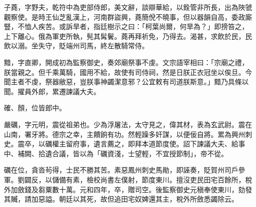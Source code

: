 \begin{pinyinscope}
 子蕘，字野夫，乾符中為吏部侍郎，美文辭，談辯華給，以銓管非所長，出為陜虢觀察使。是時王仙芝亂漢上，河南群盜興，蕘簡侻不曉事，但以器韻自高，委政廝豎，不恤人疾苦。或訴旱者，指廷樹示之曰：「柯葉尚爾，何旱為？」即搒笞之，上下離心。俄為軍吏所執，髡其髯鬢。蕘再拜祈免，乃得去。渴甚，求飲於民，民飲以溺。坐失守，貶端州司馬，終左散騎常侍。



 黯，字直卿，開成初為監察御史，奏郊廟祭事不虔。文宗語宰相曰：「宗廟之禮，朕當親之。但千乘萬騎，國用不給，故使有司侍祠，然是日朕正衣冠坐以俟旦。今聞主者不虔，祭器敝惡，豈朕事神蠲潔意邪？公宜敕有司道朕斯意。」黯乃具條以聞。擢員外郎，累遷諫議大夫。



 確、顏，位皆郎中。



 嚴礪，字元明，震從祖弟也。少為浮屠法，太守見之，偉其材，表為玄武尉。震在山南，署牙將。德宗之幸，主饋餉有功。然輕躁多奸謀，以便佞自將。累為興州刺史。震卒，以礪權主留府事，遺言薦之，即拜本道節度使。詔下諫議大夫、給事中、補闕、拾遺合議，皆以為「礪資淺，士望輕，不宜授節制」，帝不從。



 礪在位，貪沓茍得，士民不勝其苦。素惡鳳州刺史馬勛，即誣奏，貶賀州司戶參軍。劉闢反，以儲備有素，檢校尚書左僕射，節度東川。擅沒吏民田宅百餘所，稅外加斂錢及芻粟數十萬。元和四年，卒，贈司空。後監察御史元稹奉使東川，劾發其贓，請加惡謚。朝廷以其死，故但追田宅奴婢還其主，稅外所斂悉蠲除云。



\end{pinyinscope}